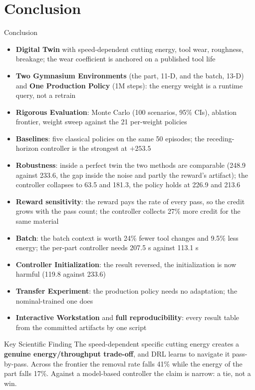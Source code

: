 ﻿\documentclass[11pt,aspectratio=169]{beamer}
\begin{document}
\section{Conclusion}

\begin{frame}{Conclusion}
    \scriptsize
    \setlength{\itemsep}{0pt}
    \begin{itemize}
        \item \textbf{Digital Twin} with speed-dependent cutting energy, tool wear, roughness, breakage; the wear coefficient is anchored on a published tool life
        \item \textbf{Two Gymnasium Environments} (the part, 11-D, and the batch, 13-D) and \textbf{One Production Policy} (1M steps): the energy weight is a runtime query, not a retrain
        \item \textbf{Rigorous Evaluation}: Monte Carlo (100 scenarios, 95\% CIs), ablation frontier, weight sweep against the 21 per-weight policies
        \item \textbf{Baselines}: five classical policies on the same 50 episodes; the receding-horizon controller is the strongest at $+253.5$
        \item \textbf{Robustness}: inside a perfect twin the two methods are comparable (248.9 against 233.6, the gap inside the noise and partly the reward's artifact); the controller collapses to 63.5 and 181.3, the policy holds at 226.9 and 213.6
        \item \textbf{Reward sensitivity}: the reward pays the rate of every pass, so the credit grows with the pass count; the controller collects 27\% more credit for the same material
        \item \textbf{Batch}: the batch context is worth 24\% fewer tool changes and 9.5\% less energy; the per-part controller needs 207.5 s against 113.1 s
        \item \textbf{Controller Initialization}: the result reversed, the initialization is now harmful (119.8 against 233.6)
        \item \textbf{Transfer Experiment}: the production policy needs no adaptation; the nominal-trained one does
        \item \textbf{Interactive Workstation} and \textbf{full reproducibility}: every result table from the committed artifacts by one script
    \end{itemize}

    \vspace{-1ex}
    \begin{alertblock}{Key Scientific Finding}
    \scriptsize
    The speed-dependent specific cutting energy creates a \textbf{genuine energy/throughput trade-off}, and DRL learns to navigate it pass-by-pass. Across the frontier the removal rate falls \alert{41\%} while the energy of the part falls \alert{17\%}. Against a model-based controller the claim is narrow: a tie, not a win.
    \end{alertblock}
\end{frame}
\end{document}

